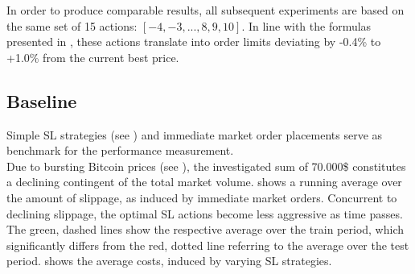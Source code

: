In order to produce comparable results, all subsequent experiments are based on the same set of 15 actions: $[-4, -3, ..., 8, 9, 10]$. In line with the formulas presented in , these actions translate into order limits deviating by -0.4\% to +1.0\% from the current best price.



\subsection{Baseline}
\label{chap:experiments:baseline}
Simple \ac{SL} strategies (see ) and immediate market order placements serve as benchmark for the performance measurement.\\

Due to bursting Bitcoin prices (see ), the investigated sum of 70.000\$ constitutes a declining contingent of the total market volume.  shows a running average over the amount of slippage, as induced by immediate market orders. Concurrent to declining slippage, the optimal \ac{SL} actions become less aggressive as time passes. The green, dashed lines show the respective average over the train period, which significantly differs from the red, dotted line referring to the average over the test period.  shows the average costs, induced by varying \ac{SL} strategies.


